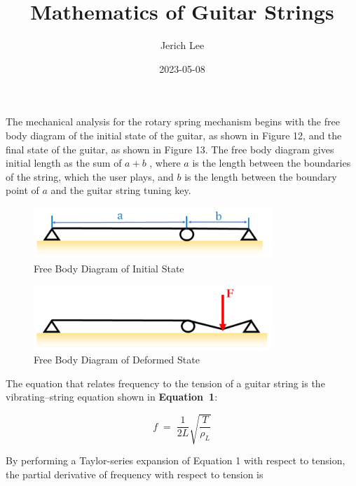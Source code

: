 \documentclass[12pt]{article}
\title{Mathematics of Guitar Strings}
\author{Jerich Lee}
\date{2023-05-08}
\theoremstyle{definition} %
\theoremstyle{plain} %
\begin{document}
\maketitle
The mechanical analysis for the rotary spring mechanism begins with the free body diagram
of the initial state of the guitar, as shown in Figure 12, and the final state of the guitar, as shown in
Figure 13. The free body diagram gives initial length as the sum of $a+b$ , where $a$ is the length
between the boundaries of the string, which the user plays, and $b$ is the length between the
boundary point of $a$ and the guitar string tuning key.

\begin{figure}[htbp]
  \centering
  \includegraphics[width=0.8\textwidth]{classes/Mathematics-of-Guitar-Strings/06-10/fgs/fig12.png}
  \caption{Free Body Diagram of Initial State}
  \label{fig:}
\end{figure}

\begin{figure}[htbp]
  \centering
  \includegraphics[width=0.8\textwidth]{classes/Mathematics-of-Guitar-Strings/06-10/fgs/fig13.png}
  \caption{Free Body Diagram of Deformed State}
  \label{fig:}
\end{figure}


The equation that relates frequency to the tension of a guitar string is
the vibrating–string equation shown in \textbf{Equation~1}:

\begin{equation}
  f \;=\; \frac{1}{2L}\sqrt{\frac{T}{\rho_L}}
  \tag{1}
\end{equation}

By performing a Taylor-series expansion of Equation 1 with respect to
tension, the partial derivative of frequency with respect to tension is
\end{document}
